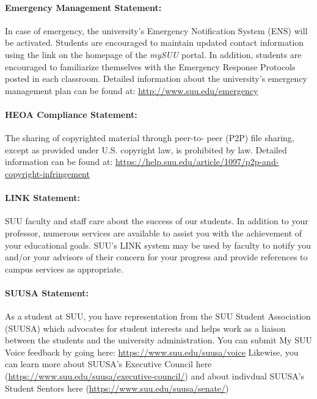 \documentclass[12pt, letterpaper]{article}
\begin{document}
\paragraph{Emergency Management Statement:}
In case of emergency, the university's Emergency Notification System (ENS) will be activated. Students are encouraged to maintain updated contact information using the link on the homepage of the \emph{mySUU} portal. In addition, students are encouraged to familiarize themselves with the Emergency Response Protocols posted in each classroom. Detailed information about the university's emergency management plan can be found at: \href{http://www.suu.edu/emergency}{http://www.suu.edu/emergency}

\paragraph{HEOA Compliance Statement:}
The sharing of copyrighted material through peer-to- peer (P2P) file sharing, except as provided under U.S. copyright law, is prohibited by law. Detailed information can be found at: \href{https://help.suu.edu/article/1097/p2p-and-copyright-infringement}{https://help.suu.edu/article/1097/p2p-and-copyright-infringement}

\paragraph{LINK Statement:}
SUU faculty and staff care about the success of our students. In addition to your professor, numerous services are available to assist you with the achievement of your educational goals. SUU's LINK system may be used by faculty to notify you and/or your advisors of their concern for your progress and provide references to campus services as appropriate.

\paragraph{SUUSA Statement:}
As a student at SUU, you have representation from the SUU Student Association (SUUSA) which advocates for student interests and helps work as a liaison between the students and the university administration. You can submit My SUU Voice feedback by going here: \href{https://www.suu.edu/suusa/voice}{https://www.suu.edu/suusa/voice} Likewise, you can learn more about SUUSA's Executive Council here (\href{https://www.suu.edu/suusa/executive-council/}{https://www.suu.edu/suusa/executive-council/}) and about indivdual SUUSA's Student Sentors here (\href{https://www.suu.edu/suusa/senate/}{https://www.suu.edu/suusa/senate/})
\end{document}
